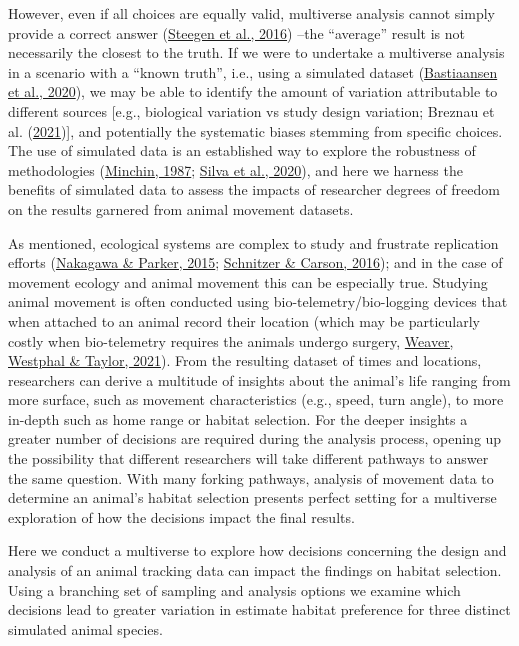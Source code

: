 \documentclass[10pt,a4paper]{article}
\begin{document}
However, even if all choices are equally valid, multiverse analysis cannot simply provide a correct answer (\protect\hyperlink{ref-steegen_increasing_2016}{Steegen et al., 2016}) --the ``average'' result is not necessarily the closest to the truth.
If we were to undertake a multiverse analysis in a scenario with a ``known truth'', i.e., using a simulated dataset (\protect\hyperlink{ref-bastiaansen_time_2020}{Bastiaansen et al., 2020}), we may be able to identify the amount of variation attributable to different sources {[}e.g., biological variation vs study design variation; Breznau et al. (\protect\hyperlink{ref-breznau_observing_2021}{2021}){]}, and potentially the systematic biases stemming from specific choices.
The use of simulated data is an established way to explore the robustness of methodologies (\protect\hyperlink{ref-minchin_simulation_1987}{Minchin, 1987}; \protect\hyperlink{ref-silva_reptiles_2020}{Silva et al., 2020}), and here we harness the benefits of simulated data to assess the impacts of researcher degrees of freedom on the results garnered from animal movement datasets.

As mentioned, ecological systems are complex to study and frustrate replication efforts (\protect\hyperlink{ref-nakagawa_replicating_2015}{Nakagawa \& Parker, 2015}; \protect\hyperlink{ref-schnitzer_would_2016}{Schnitzer \& Carson, 2016}); and in the case of movement ecology and animal movement this can be especially true.
Studying animal movement is often conducted using bio-telemetry/bio-logging devices that when attached to an animal record their location (which may be particularly costly when bio-telemetry requires the animals undergo surgery, \protect\hyperlink{ref-weaver_technology_2021}{Weaver, Westphal \& Taylor, 2021}).
From the resulting dataset of times and locations, researchers can derive a multitude of insights about the animal's life ranging from more surface, such as movement characteristics (e.g., speed, turn angle), to more in-depth such as home range or habitat selection.
For the deeper insights a greater number of decisions are required during the analysis process, opening up the possibility that different researchers will take different pathways to answer the same question.
With many forking pathways, analysis of movement data to determine an animal's habitat selection presents perfect setting for a multiverse exploration of how the decisions impact the final results.

Here we conduct a multiverse to explore how decisions concerning the design and analysis of an animal tracking data can impact the findings on habitat selection.
Using a branching set of sampling and analysis options we examine which decisions lead to greater variation in estimate habitat preference for three distinct simulated animal species.
\end{document}
